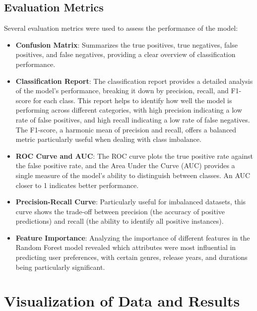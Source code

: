 \documentclass[sigconf]{acmart}
\begin{document}
	\subsection{Evaluation Metrics}
	Several evaluation metrics were used to assess the performance of the model:
	\begin{itemize}
		\item \textbf{Confusion Matrix}: Summarizes the true positives, true negatives, false positives, and false negatives, providing a clear overview of classification performance.
		\item \textbf{Classification Report}: The classification report provides a detailed analysis of the model’s performance, breaking it down by precision, recall, and F1-score for each class. This report helps to identify how well the model is performing across different categories, with high precision indicating a low rate of false positives, and high recall indicating a low rate of false negatives. The F1-score, a harmonic mean of precision and recall, offers a balanced metric particularly useful when dealing with class imbalance.
		\item \textbf{ROC Curve and AUC}: The ROC curve plots the true positive rate against the false positive rate, and the Area Under the Curve (AUC) provides a single measure of the model's ability to distinguish between classes. An AUC closer to 1 indicates better performance.
		\item \textbf{Precision-Recall Curve}: Particularly useful for imbalanced datasets, this curve shows the trade-off between precision (the accuracy of positive predictions) and recall (the ability to identify all positive instances).
		\item \textbf{Feature Importance}: Analyzing the importance of different features in the Random Forest model revealed which attributes were most influential in predicting user preferences, with certain genres, release years, and durations being particularly significant.
	\end{itemize}
	\section{Visualization of Data and Results}
\end{document}
